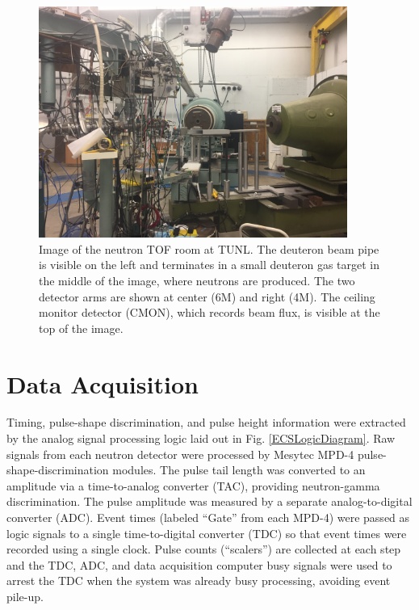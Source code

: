 \begin{figure}[tb]
    \centering
    \includegraphics[width = 0.9\textwidth]{figures/TOFRoomPhoto.jpg}
    \caption[Image of the neutron TOF room at TUNL] 
    {
    Image of the neutron TOF room at TUNL. The deuteron beam pipe is visible on the left and
    terminates in a small deuteron gas target in the middle of the image, where neutrons are
    produced. The two detector arms are shown at center (6M) and right (4M). The ceiling
    monitor detector (CMON), which records beam flux, is visible at the top of the image.
    }
    \label{TOFRoomPhoto}
\end{figure}

\section{Data Acquisition}
Timing, pulse-shape discrimination, and pulse height information were
extracted by the analog signal processing logic laid out in Fig. \ref{ECSLogicDiagram}.
Raw signals from each neutron detector were processed by Mesytec MPD-4
pulse-shape-discrimination modules. The pulse tail length was converted to an
amplitude via a time-to-analog converter (TAC), providing neutron-gamma
discrimination. The pulse amplitude was measured by a separate
analog-to-digital converter (\gls{ADC}). Event times (labeled ``Gate'' from each MPD-4)
were passed as logic signals to a single time-to-digital converter (\gls{TDC}) so that
event times were recorded using a single clock. Pulse counts (``scalers'') are
collected at each step and the TDC, ADC, and data acquisition computer busy
signals were used to arrest the TDC when the system was already busy processing,
avoiding event pile-up.

